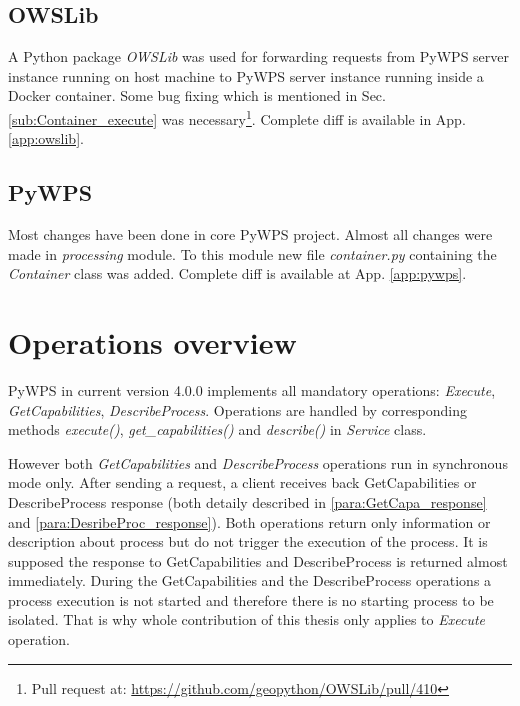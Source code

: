 \subsection{OWSLib}
\label{sub:owslib}
A Python package \textit{OWSLib} was used for forwarding requests from
PyWPS server instance running on host machine to PyWPS server instance
running inside a Docker container. Some bug fixing which is
mentioned in Sec.\ref{sub:Container_execute} was necessary\footnote{Pull request at: \url{https://github.com/geopython/OWSLib/pull/410}}. Complete
diff is available in App. \ref{app:owslib}. 

\subsection{PyWPS}
Most changes have been done in core PyWPS project. Almost all changes were made in \textit{processing} module. To this module new file
\textit{container.py} containing the \textit{Container} class was added. Complete diff is available at App. \ref{app:pywps}.

\newpage
\section{Operations overview}
\label{sec:operations_ov}
PyWPS in current version 4.0.0 implements all mandatory operations: \textit{Execute}, \textit{GetCapabilities}, \textit{DescribeProcess}.
Operations are handled by corresponding methods \textit{execute()}, \textit{get\_capabilities()} and \textit{describe()} in \textit{Service} class. 

However both \textit{GetCapabilities} and \textit{DescribeProcess}
operations run in synchronous mode only. After sending a request, a
client receives back GetCapabilities or DescribeProcess response (both
detaily described in \ref{para:GetCapa_response} and
\ref{para:DesribeProc_response}). Both operations return only
information or description about process but do not trigger the
execution of the process. It is supposed the response to
GetCapabilities and DescribeProcess is returned almost immediately.
During the GetCapabilities and the DescribeProcess operations a
process execution is not started and therefore there is no starting
process to be isolated. That is why whole contribution of this thesis
only applies to \textit{Execute} operation.


